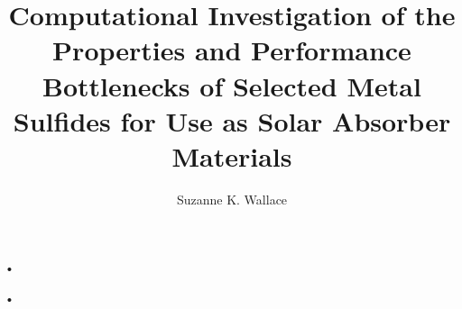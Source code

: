 \documentclass[a4paper,12pt,twoside]{report}
\begin{document}
\title{\LARGE {\bf Computational Investigation of the Properties and Performance Bottlenecks of Selected Metal Sulfides for Use as Solar Absorber Materials}\\
 \vspace*{6mm}
}

\author{Suzanne K. Wallace}
\submitdate{\today}

\normallinespacing
\maketitle
\begin{scriptsize}
{\footnotesize •\begin{small}
•
\end{small}}
\end{scriptsize}
\preface


%
%

\body








\appendix




\end{document}
